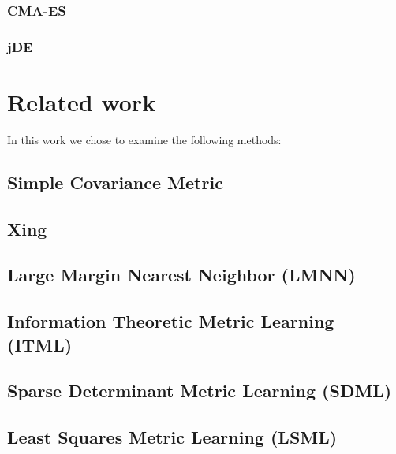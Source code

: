 \documentclass[12pt,a4paper]{report}
\begin{document}
\subsection{CMA-ES} \label{chap:ea:cmaes}
\subsection{jDE} \label{chap:ea:jde}


\chapter{Related work} \label{chap:rw}

In this work we chose to examine the following methods:

\section{Simple Covariance Metric} \label{chap:rw:cov}
\cite{mahalanobis1936generalized}

\section{Xing} \label{chap:rw:xing}
\cite{xing2002distance}

\section{Large Margin Nearest Neighbor (LMNN)} \label{chap:rw:lmnn}
\cite{weinberger2009distance}

\section{Information Theoretic Metric Learning (ITML)} \label{chap:rw:itml}
\cite{davis2007information}

\section{Sparse Determinant Metric Learning (SDML)} \label{chap:rw:sdml}
\cite{qi2009efficient}

\section{Least Squares Metric Learning (LSML)} \label{chap:rw:lsml}
\cite{liu2012metric}
\end{document}
